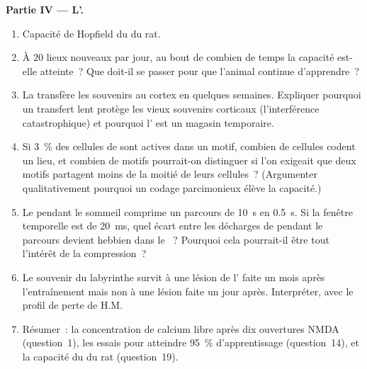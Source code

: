 \begin{problem}
\medskip
\noindent\textbf{Partie IV --- L'.}
\begin{enumerate}[resume]
  \item Capacité de Hopfield du  du rat.
  \item À $20$ lieux nouveaux par jour, au bout de combien de temps la
        capacité est-elle atteinte~? Que doit-il se passer pour que
        l'animal continue d'apprendre~?
  \item La  transfère les souvenirs au cortex en quelques
        semaines. Expliquer pourquoi un transfert lent protège les
        vieux souvenirs corticaux (l'interférence catastrophique) et
        pourquoi l' est un magasin temporaire.
  \item Si \qty{3}{\%} des cellules de  sont actives dans un motif,
        combien de cellules codent un lieu, et combien de motifs
        pourrait-on distinguer si l'on exigeait que deux motifs
        partagent moins de la moitié de leurs cellules~? (Argumenter
        qualitativement pourquoi un codage parcimonieux élève la
        capacité.)
  \item Le  pendant le sommeil comprime un parcours de \qty{10}{s}
        en \qty{0.5}{s}. Si la fenêtre temporelle est de \qty{20}{ms},
        quel écart entre les décharges de  pendant le
        parcours devient hebbien dans le ~? Pourquoi cela
        pourrait-il être tout l'intérêt de la compression~?
  \item Le souvenir du labyrinthe survit à une lésion de l'
        faite un mois après l'entraînement mais non à une lésion faite
        un jour après. Interpréter, avec le profil de perte de H.M.
  \item Résumer~: la concentration de calcium libre après dix ouvertures
        NMDA (question~1), les essais pour atteindre \qty{95}{\%}
        d'apprentissage (question~14), et la capacité du  du rat
        (question~19).
\end{enumerate}
\end{problem}
